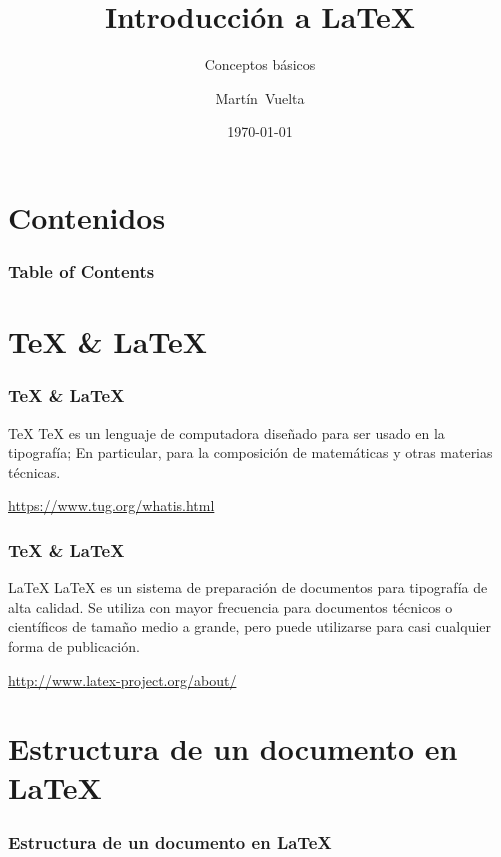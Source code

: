 \documentclass{beamer}
\begin{document}
\title[\LaTeX]{Introducción a \LaTeX}
\subtitle{Conceptos básicos}
\author[@zodiacfireworks]{Martín~Vuelta}



\date{\today}
\frame{\titlepage}

\section{Contenidos}
    \begin{frame}
    \frametitle{Table of Contents}
    \tableofcontents
    \end{frame}

\section{{\TeX} \& {\LaTeX}}
    \begin{frame}
        \frametitle{{\TeX} \& {\LaTeX}}

        \begin{block}{{\TeX}}
            {\TeX} es un lenguaje de computadora diseñado para ser usado en la tipografía; En particular, para la composición de matemáticas y otras materias técnicas.
        \end{block}

        \href{https://www.tug.org/whatis.html}{https://www.tug.org/whatis.html}
    \end{frame}

    \begin{frame}
        \frametitle{{\TeX} \& {\LaTeX}}

        \begin{block}{{\LaTeX}}
            {\LaTeX} es un sistema de preparación de documentos para tipografía de alta calidad. Se utiliza con mayor frecuencia para documentos técnicos o científicos de tamaño medio a grande, pero puede utilizarse para casi cualquier forma de publicación.
        \end{block}

        \href{http://www.latex-project.org/about/}{http://www.latex-project.org/about/}
    \end{frame}

\section{Estructura de un documento en {\LaTeX}}
    \begin{frame}
        \frametitle{Estructura de un documento en {\LaTeX}}
        \inputminted{text}{resources/snippets/document_structure.txt}


    \end{frame}
\end{document}
